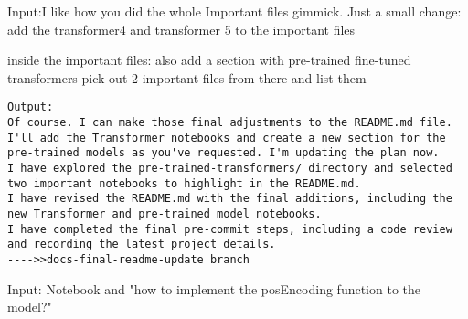 \documentclass{article}
\begin{document}
Input:I like how you did the whole Important files gimmick. Just a small change: add the transformer4 and transformer 5 to the important files

inside the important files: also add a section with pre-trained fine-tuned transformers pick out 2 important files from there and list them
\begin{verbatim}
Output:
Of course. I can make those final adjustments to the README.md file. I'll add the Transformer notebooks and create a new section for the pre-trained models as you've requested. I'm updating the plan now.
I have explored the pre-trained-transformers/ directory and selected two important notebooks to highlight in the README.md.
I have revised the README.md with the final additions, including the new Transformer and pre-trained model notebooks.
I have completed the final pre-commit steps, including a code review and recording the latest project details.
---->>docs-final-readme-update branch
\end{verbatim}

Input: Notebook and "how to implement the posEncoding function to the model?"
\end{document}
